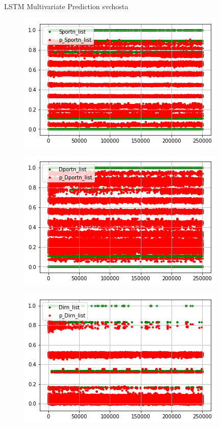 \documentclass[t]{beamer}
\begin{document}
\begin{frame}{LSTM Multivariate Prediction svchosta}
\begin{subfigure}[b]{0.3\linewidth}
    \end{subfigure}
    \begin{subfigure}[b]{0.3\linewidth}
        \includegraphics[width=\textwidth]{public/assets/img/lstmm_svchosta_pred4.png}
    \end{subfigure}
    \begin{subfigure}[b]{0.3\linewidth}
        \includegraphics[width=\textwidth]{public/assets/img/lstmm_svchosta_pred5.png}
    \end{subfigure}
    \begin{subfigure}[b]{0.3\linewidth}
        \includegraphics[width=\textwidth]{public/assets/img/lstmm_svchosta_pred6.png}

\end{subfigure}
\end{frame}
\end{document}
